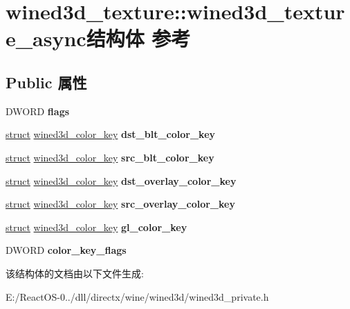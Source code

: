\hypertarget{structwined3d__texture_1_1wined3d__texture__async}{}\section{wined3d\+\_\+texture\+:\+:wined3d\+\_\+texture\+\_\+async结构体 参考}
\label{structwined3d__texture_1_1wined3d__texture__async}
\subsection*{Public 属性}
\begin{DoxyCompactItemize}
\item 
\mbox{\label{structwined3d__texture_1_1wined3d__texture__async_abd6bc3a2e1122ddeb978660a5cc2d514}} 
D\+W\+O\+RD {\bfseries flags}
\item 
\mbox{\label{structwined3d__texture_1_1wined3d__texture__async_a8e986a7a4508b2d8b9ea33cde91ad598}} 
\hyperlink{interfacestruct}{struct} \hyperlink{structwined3d__color__key}{wined3d\+\_\+color\+\_\+key} {\bfseries dst\+\_\+blt\+\_\+color\+\_\+key}
\item 
\mbox{\label{structwined3d__texture_1_1wined3d__texture__async_a8dadca1e76275ea1a2f9101b3a0176a7}} 
\hyperlink{interfacestruct}{struct} \hyperlink{structwined3d__color__key}{wined3d\+\_\+color\+\_\+key} {\bfseries src\+\_\+blt\+\_\+color\+\_\+key}
\item 
\mbox{\label{structwined3d__texture_1_1wined3d__texture__async_ae0e6bd8256264b02dfa3c6d17e067942}} 
\hyperlink{interfacestruct}{struct} \hyperlink{structwined3d__color__key}{wined3d\+\_\+color\+\_\+key} {\bfseries dst\+\_\+overlay\+\_\+color\+\_\+key}
\item 
\mbox{\label{structwined3d__texture_1_1wined3d__texture__async_ab63ad99d38049badd01f45659bb36b15}} 
\hyperlink{interfacestruct}{struct} \hyperlink{structwined3d__color__key}{wined3d\+\_\+color\+\_\+key} {\bfseries src\+\_\+overlay\+\_\+color\+\_\+key}
\item 
\mbox{\label{structwined3d__texture_1_1wined3d__texture__async_a61368cc0a18df560c2830eb7b1feaa36}} 
\hyperlink{interfacestruct}{struct} \hyperlink{structwined3d__color__key}{wined3d\+\_\+color\+\_\+key} {\bfseries gl\+\_\+color\+\_\+key}
\item 
\mbox{\label{structwined3d__texture_1_1wined3d__texture__async_a5709814040e1d62b4690e29ee1afbb12}} 
D\+W\+O\+RD {\bfseries color\+\_\+key\+\_\+flags}
\end{DoxyCompactItemize}


该结构体的文档由以下文件生成\+:\begin{DoxyCompactItemize}
\item 
E\+:/\+React\+O\+S-\/0../dll/directx/wine/wined3d/wined3d\+\_\+private.\+h\end{DoxyCompactItemize}
